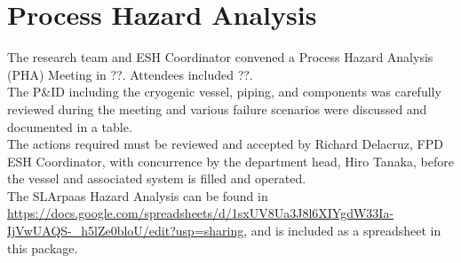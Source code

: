 \section{Process Hazard Analysis}
\label{sec:hazard_ana}

The research team and ESH Coordinator convened a Process Hazard Analysis (PHA) 
Meeting in ??. 
Attendees included ??.\\

The P\&ID including the cryogenic vessel, piping, and components was carefully reviewed 
during the meeting and various failure scenarios were discussed and documented in a table.\\

The actions required must be reviewed and accepted by Richard Delacruz, FPD ESH Coordinator, 
with concurrence by the department head, Hiro Tanaka, before the vessel and associated 
system is filled and operated.\\

The SLArpaas Hazard Analysis can be found in
\url{https://docs.google.com/spreadsheets/d/1sxUV8Ua3J8l6XIYgdW33Ia-IjVwUAQS-_h5lZe0bloU/edit?usp=sharing},
and is included as a spreadsheet in this package.

